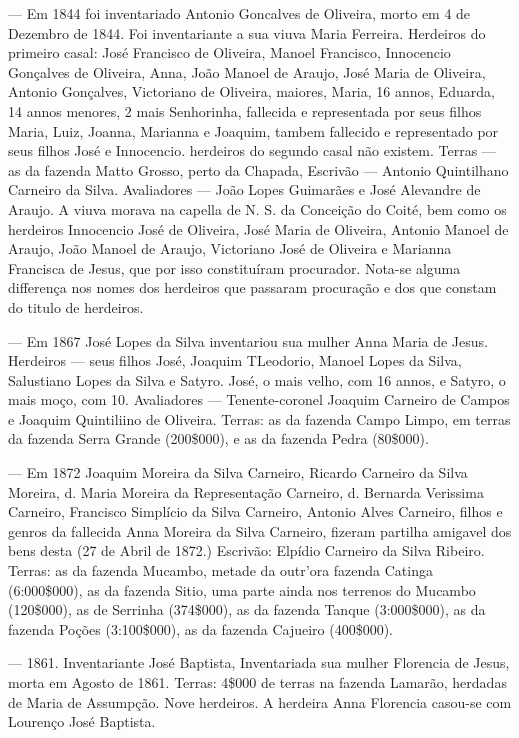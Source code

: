— Em 1844 foi inventariado Antonio Goncalves de Oliveira, morto em 4 de Dezembro de 1844. Foi inventariante a sua viuva Maria Ferreira. Herdeiros do primeiro casal: José Francisco de Oliveira, Manoel Francisco, Innocencio Gonçalves de Oliveira, Anna, João Manoel de Araujo, José Maria de Oliveira, Antonio Gonçalves, Victoriano de Oliveira, maiores, Maria, 16 annos, Eduarda, 14 annos menores, 2 mais Senhorinha, fallecida e representada por seus filhos Maria, Luiz, Joanna, Marianna e Joaquim, tambem fallecido e representado por seus filhos José e Innocencio. herdeiros do segundo casal não existem. Terras — as da fazenda Matto Grosso, perto da Chapada, Escrivão — Antonio Quintilhano Carneiro da Silva. Avaliadores — João Lopes Guimarães e José Alevandre de Araujo. A viuva morava na capella de N. S. da Conceição do Coité, bem como os herdeiros Innocencio José de Oliveira, José Maria de Oliveira, Antonio Manoel de Araujo, João Manoel de Araujo, Victoriano José de Oliveira e Marianna Francisca de Jesus, que por isso constituíram procurador. Nota-se alguma differença nos nomes dos herdeiros que passaram procuração e dos que constam do titulo de herdeiros.


— Em 1867 José Lopes da Silva inventariou sua mulher Anna Maria de Jesus. Herdeiros — seus filhos José, Joaquim TLeodorio, Manoel Lopes da Silva, Salustiano Lopes da Silva e Satyro. José, o mais velho, com 16 annos, e Satyro, o mais moço, com 10. Avaliadores — Tenente-coronel Joaquim Carneiro de Campos e Joaquim Quintiliino de Oliveira. Terras: as da fazenda Campo Limpo, em terras da fazenda Serra Grande (200\$000), e as da fazenda Pedra (80\$000).

— Em 1872 Joaquim Moreira da Silva Carneiro, Ricardo Carneiro da Silva Moreira, d. Maria Moreira da Representação Carneiro, d. Bernarda Verissima Carneiro, Francisco Simplício da Silva Carneiro, Antonio Alves Carneiro, filhos e genros da fallecida Anna Moreira da Silva Carneiro, fizeram partilha amigavel dos bens desta (27 de Abril de 1872.) Escrivão: Elpídio Carneiro da Silva Ribeiro. Terras: as da fazenda Mucambo, metade da outr'ora fazenda Catinga (6:000\$000), as da fazenda Sitio, uma parte ainda nos terrenos do Mucambo (120\$000), as de Serrinha (374\$000), as da fazenda Tanque (3:000\$000), as da fazenda Poções (3:100\$000), as da fazenda Cajueiro (400\$000).

— 1861. Inventariante José Baptista, Inventariada sua mulher Florencia de Jesus, morta em Agosto de 1861. Terras: 4\$000 de terras na fazenda Lamarão, herdadas de Maria de Assumpção. Nove herdeiros. A herdeira Anna Florencia casou-se com Lourenço José Baptista.


